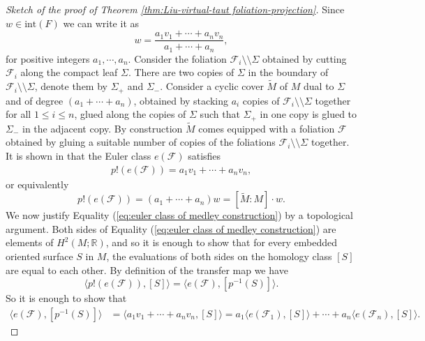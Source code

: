 \documentclass[10pt,a4paper]{amsart}
\begin{document}
\begin{proof}[Sketch of the proof of Theorem \ref{thm:Liu-virtual-taut foliation-projection}]
	Since $w \in \mathrm{int} (F) $ we can write it as 
	\[ w =  \frac{a_1 v_1 + \cdots + a_n v_n}{a_1 + \cdots + a_n},\]
	for positive integers $a_1 , \cdots, a_n$. Consider the foliation $\mathcal{F}_i \setminus \setminus \Sigma$ obtained by cutting $\mathcal{F}_i$ along the compact leaf $\Sigma$. There are two copies of $\Sigma$ in the boundary of $\mathcal{F}_i \setminus \setminus \Sigma$, denote them by $\Sigma_+$ and $\Sigma_-$. Consider a cyclic cover $\tilde{M}$ of $M$ dual to $\Sigma$ and of degree $(a_1 + \cdots + a_n)$, obtained by stacking $a_i$ copies of $\mathcal{F}_i \setminus \setminus \Sigma$ together for all $1 \leq i \leq n$, glued along the copies of $\Sigma$ such that $\Sigma_+$ in one copy is glued to $\Sigma_-$ in the adjacent copy. By construction $\tilde{M}$ comes equipped with a foliation $\mathcal{F}$ obtained by gluing a suitable number of copies of the foliations $\mathcal{F}_i \setminus \setminus \Sigma$ together. It is shown in \cite[Lemma 4.3]{liu2024criterion} that the Euler class $e(\mathcal{F})$ satisfies 
	\begin{eqnarray}
		p!(e(\mathcal{F})) = a_1 v_1 + \cdots + a_n v_n,
		\label{eq:euler class of medley construction}
	\end{eqnarray}
	or equivalently
	\[  p!(e(\mathcal{F}))  = (a_1 + \cdots + a_n) w = [\tilde{M} : M] \cdot w. \]
	We now justify Equality (\ref{eq:euler class of medley construction}) by a topological argument. Both sides of Equality (\ref{eq:euler class of medley construction}) are elements of $H^2(M ; \mathbb{R})$, and so it is enough to show that for every embedded oriented surface $S$ in $M$, the evaluations of both sides on the homology class $[S]$ are equal to each other. By definition of the transfer map we have 
	\[ \langle p!(e(\mathcal{F}))  , [S] \rangle = \langle e(\mathcal{F}) , [p^{-1}(S)] \rangle . \]
	So it is enough to show that 
	\begin{align*} \langle e(\mathcal{F}) , [p^{-1}(S)] \rangle  &= \langle  a_1 v_1 + \cdots + a_n v_n , [S] \rangle =  a_1 \langle e(\mathcal{F}_1) , [S] \rangle + \cdots + a_n  \langle e(\mathcal{F}_n) , [S] \rangle.
	\end{align*}

\end{proof}
\end{document}
